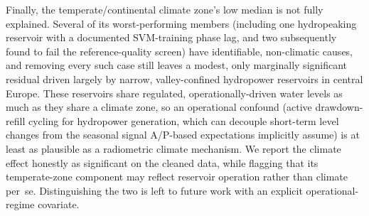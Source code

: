 Finally, the temperate/continental climate zone's low median is not fully
explained. Several of its worst-performing members (including one hydropeaking
reservoir with a documented SVM-training phase lag, and two subsequently found
to fail the reference-quality screen) have identifiable, non-climatic causes,
and removing every such case still leaves a modest, only marginally significant
residual driven largely by narrow, valley-confined hydropower reservoirs in
central Europe. These reservoirs share regulated, operationally-driven water
levels as much as they share a climate zone, so an operational confound
(active drawdown-refill cycling for hydropower generation, which can decouple
short-term level changes from the seasonal signal A/P-based expectations
implicitly assume) is at least as plausible as a radiometric climate mechanism.
We report the climate effect honestly as significant on the cleaned data,
while flagging that its temperate-zone component may reflect reservoir
operation rather than climate per~se. Distinguishing the two is left to future
work with an explicit operational-regime covariate.
